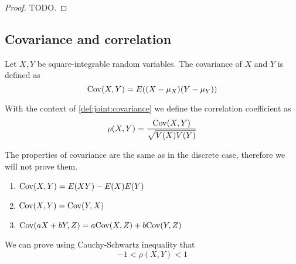 \documentclass[14pt]{extarticle}
\newcommand{\cov}{{\operatorfont Cov}}
\begin{document}
\begin{proof}
    TODO.
\end{proof}

\subsection{Covariance and correlation}

\begin{definition}[covariance]
    \label{def:joint:covariance}
    Let $X, Y$ be square-integrable random variables.
    The covariance of $X$ and $Y$ is defined as
    \begin{equation}
        \cov(X, Y) = E((X - \mu_X)(Y - \mu_Y))
    \end{equation}
\end{definition}

\begin{definition}
    With the context of \autoref{def:joint:covariance} we define the correlation coefficient as
    \begin{equation}
        \rho(X, Y) = \frac{\cov (X, Y)}{\sqrt{V(X)V(Y)}}
    \end{equation}
\end{definition}


\begin{proposition}
    \label{prop:joint:properties_covariance}

    The properties of covariance are the same as in the discrete case, therefore we will not prove them.

    \begin{enumerate}
        \item $\cov(X, Y) = E(XY) - E(X)E(Y)$
        \item $\cov(X,Y) = \cov(Y,X)$
        \item $\cov(aX + bY, Z) = a \cov(X, Z) + b \cov(Y, Z)$
    \end{enumerate}
\end{proposition}

\begin{proposition}
    We can prove using Cauchy-Schwartz inequality that
    \begin{equation}
        -1 < \rho(X, Y) < 1
    \end{equation}
\end{proposition}

\end{document}
